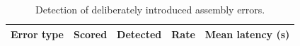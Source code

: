 \begin{table}[H]
\centering
\caption{Detection of deliberately introduced assembly errors.}
\label{tab:v21_error_handling}
\renewcommand{\arraystretch}{1.3}
\setlength{\tabcolsep}{6pt}

\begin{tabular}{|l|c|c|c|c|}
\hline
\textbf{Error type} & \textbf{Scored} & \textbf{Detected} & \textbf{Rate} & \textbf{Mean latency (s)} \\
\hline
\end{tabular}
\end{table}